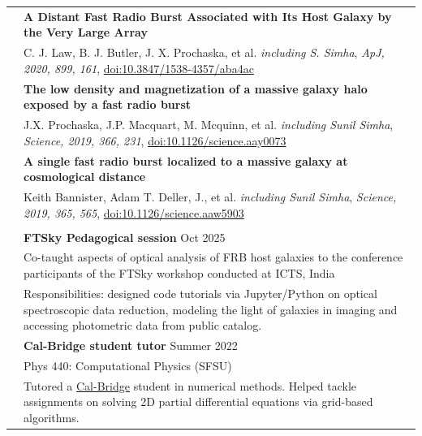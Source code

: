 \documentclass[letterpaper, 11pt]{article}
\begin{document}
\begin{longtable}{p{1.3in}p{4.8in}}
& \textbf{A Distant Fast Radio Burst Associated with Its Host Galaxy by the Very Large Array} \\
& C. J. Law, B. J. Butler, J. X. Prochaska, et al. \textit{including S. Simha}, \textit{ApJ, 2020, 899, 161}, \href{https://ui.adsabs.harvard.edu/link_gateway/2020ApJ...899..161L/doi:10.3847/1538-4357/aba4ac}{doi:10.3847/1538-4357/aba4ac}\\

& \textbf{The low density and magnetization of a massive galaxy halo exposed by a fast radio burst } \\
& J.X. Prochaska, J.P. Macquart, M. Mcquinn, et al. \textit{including Sunil Simha}, \textit{Science, 2019, 366, 231}, \href{https://ui.adsabs.harvard.edu/link_gateway/2019Sci...366..231P/doi:10.1126/science.aay0073}{doi:10.1126/science.aay0073}\\

& \textbf{A single fast radio burst localized to a massive galaxy at cosmological distance} \\
& Keith Bannister, Adam T. Deller, J., et al. \textit{including Sunil Simha}, \textit{Science, 2019, 365, 565}, \href{https://ui.adsabs.harvard.edu/link_gateway/2019Sci...365..565B/doi:10.1126/science.aaw5903}{doi:10.1126/science.aaw5903}\\
\hline
&\\
{\color{OliveGreen}{Teaching experience}}
& \textbf{FTSky Pedagogical session} \hfill Oct 2025 \\
& Co-taught aspects of optical analysis of FRB host galaxies to the conference participants of the FTSky workshop conducted at ICTS, India\\
& Responsibilities: designed code tutorials via Jupyter/Python on optical spectroscopic data reduction, modeling the light of galaxies in imaging and accessing photometric data from public catalog.\\
& \textbf{Cal-Bridge student tutor} \hfill Summer 2022\\
& Phys 440: Computational Physics (SFSU)\\
& Tutored a \href{https://calbridge.smapply.org/}{Cal-Bridge} student in numerical methods. Helped tackle assignments on solving 2D partial differential equations via grid-based algorithms.\\


\end{longtable}
\end{document}
